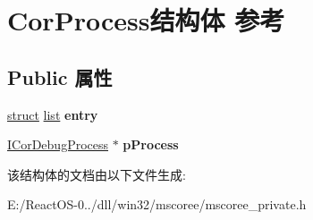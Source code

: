 \hypertarget{struct_cor_process}{}\section{Cor\+Process结构体 参考}
\label{struct_cor_process}
\subsection*{Public 属性}
\begin{DoxyCompactItemize}
\item 
\mbox{\label{struct_cor_process_ac366d9f8d09bab71e944b9ecf247de83}} 
\hyperlink{interfacestruct}{struct} \hyperlink{classlist}{list} {\bfseries entry}
\item 
\mbox{\label{struct_cor_process_ac7c727d2e0ddebe41a48a8425a7e37a1}} 
\hyperlink{interface_i_cor_debug_process}{I\+Cor\+Debug\+Process} $\ast$ {\bfseries p\+Process}
\end{DoxyCompactItemize}


该结构体的文档由以下文件生成\+:\begin{DoxyCompactItemize}
\item 
E\+:/\+React\+O\+S-\/0../dll/win32/mscoree/mscoree\+\_\+private.\+h\end{DoxyCompactItemize}
